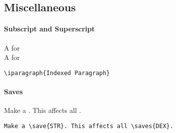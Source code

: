 \documentclass[itdr]{subfiles}
\begin{document}
\subsection{Miscellaneous}

\paragraph{Subscript and Superscript}

\fbox{\lstinline!\\tsub\{\}!} A  for \fbox{\lstinline!\\textsubscript\{\}!}\\
\fbox{\lstinline!\\tsup\{\}!} A  for \fbox{\lstinline!\\textsuperscript\{\}!}\\

\vspace{-1ex}
\begin{lstlisting}
\iparagraph{Indexed Paragraph}
\end{lstlisting}

\vspace{-1ex}
\paragraph{Saves}

Make a . This affects all .

\begin{lstlisting}
Make a \save{STR}. This affects all \saves{DEX}.
\end{lstlisting}

\vspace{-1ex}
\end{document}
